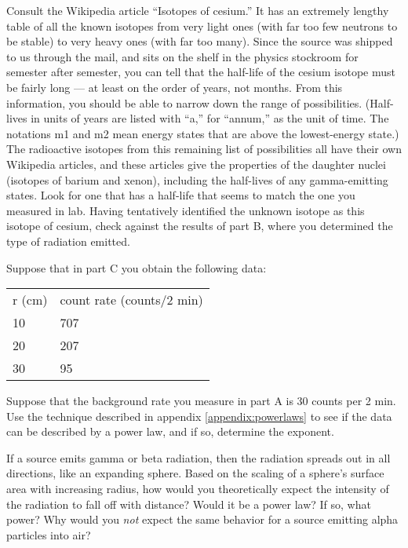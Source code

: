Consult the Wikipedia article ``Isotopes of cesium.'' It has an extremely lengthy
table of all the known isotopes from very light ones (with far too few neutrons to
be stable) to very heavy ones (with far too many). Since the source was shipped to us
through the mail, and sits on the shelf in the physics stockroom for semester after
semester, you can tell that the half-life of the cesium isotope must be fairly long ---
at least on the order of years, not months. From this information, you should be able
to narrow down the range of possibilities. (Half-lives in units of years are listed with
``a,'' for ``annum,'' as the unit of time. The notations m1 and m2 mean energy states
that are above the lowest-energy state.) The radioactive isotopes from this remaining
list of possibilities all have their own Wikipedia articles, and these articles give
the properties of the daughter nuclei (isotopes of barium and xenon), including the half-lives
of any gamma-emitting states. Look for one that has a half-life that seems to match
the one you measured in lab. Having tentatively identified the unknown isotope as
this isotope of cesium, check against the results of part B, where you determined
the type of radiation emitted.

\prelab

\prelabquestion
Suppose that in part C you obtain the following data:

\begin{tabular}{ll}
r (cm) & count rate (counts/2 min) \\
10      & 707 \\
20     & 207 \\
30     & 95
\end{tabular}

Suppose that the background rate you measure in part A
is 30 counts per 2 min. Use the technique
described in appendix \ref{appendix:powerlaws} to see if the data can be described
by a power law, and if so, determine the exponent.

\prelabquestion
If a source emits gamma or beta radiation, then the radiation spreads out in all
directions, like an expanding sphere. Based on the scaling of a sphere's surface
area with increasing radius, how would you theoretically expect the
intensity of the radiation to fall off with distance? Would it be a power law?
If so, what power? Why would you \emph{not} expect the same behavior for a source
emitting alpha particles into air?
